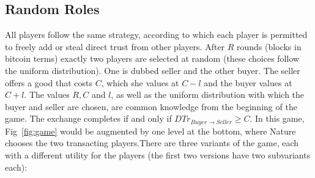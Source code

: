 \subsection{Random Roles}
  All players follow the same strategy, according to which each player is permitted to freely add or steal direct trust from
  other players. After $R$ rounds (blocks in bitcoin terms) exactly two players are selected at random (these choices follow
  the uniform distribution). One is dubbed seller and the other buyer. The seller offers a good that costs $C$, which she
  values at $C - l$ and the buyer values at $C + l$. The values $R, C$ and $l$, as well as the uniform distribution with which
  the buyer and seller are chosen, are common knowledge from the beginning of the game. The exchange completes if and only if
  $DTr_{Buyer \rightarrow Seller} \geq C$. In this game, Fig~\ref{fig:game} would be augmented by one level at the bottom,
  where Nature chooses the two transacting players.There are three variants of the game, each with a different utility for the
  players (the first two versions have two subvariants each):

